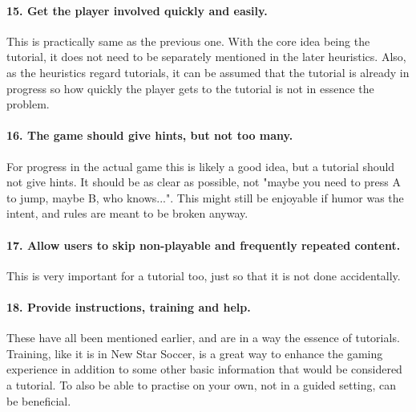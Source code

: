 \paragraph{15. Get the player involved quickly and easily.}
This is practically same as the previous one. With the core idea being the tutorial, it does not need to be separately mentioned in the later heuristics. Also, as the heuristics regard tutorials, it can be assumed that the tutorial is already in progress so how quickly the player gets to the tutorial is not in essence the problem.

\paragraph{16. The game should give hints,  but not too many.} For progress in the actual game this is likely a good idea, but a tutorial should not give hints. It should be as clear as possible, not "maybe you need to press A to jump, maybe B, who knows...". This might still be enjoyable if humor was the intent, and rules are meant to be broken anyway.

\paragraph{17. Allow users to skip non-playable and frequently repeated content.} This is very important for a tutorial too, just so that it is not done accidentally.

\paragraph{18. Provide instructions, training and help.} These have all been mentioned earlier, and are in a way the essence of tutorials. Training, like it is in New Star Soccer, is a great way to enhance the gaming experience in addition to some other basic information that would be considered a tutorial. To also be able to practise on your own, not in a guided setting, can be beneficial.

